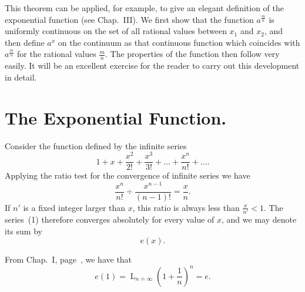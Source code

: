 \documentclass[a4paper,12pt]{book}[2004/02/16]
\providecommand{\hyperlink}[2]{#2}
\providecommand{\hypertarget}[2]{#2}
\theoremstyle{ilemma}
\theoremstyle{itheorem}
\theoremstyle{iother}
\theoremstyle{icorollary}
\theoremstyle{numcorollary}
\theoremstyle{idefinition}
\renewcommand{\dfrac}[2]{\frac{#1}{#2}}%
\begin{document}
This theorem can be applied, for example, to give an elegant
definition of the exponential function (see Chap.~\hyperlink{chapIII}{III}). We first show
that the function $a^\frac mn$ is uniformly continuous on the set of
all rational values between $x_1$ and $x_2$, and then define
$a^x$ on the continuum as that continuous function which coincides
with $a^\frac mn$ for the rational values $\dfrac mn$. The properties
of the function then follow very easily. It will be an excellent
exercise for the reader to carry out this development in detail.


\section{The Exponential Function.}\hypertarget{chVsec4}{}%
\label{s4p97}
Consider the function defined by the infinite series
\[
1+x+\frac{x^2}{2!}+\frac{x^3}{3!}+\ldots+\frac{x^n}{n!}+\ldots.
\tag{1}
\]
Applying the ratio test for the convergence of infinite series we have
\[
  \frac{x^n}{n!}\div\frac{x^{n-1}}{(n-1)!}=\frac xn.
\]
If $n'$ is a fixed integer larger than $x$, this ratio is always less
than $\dfrac x{n'}<1$. The series~(1) therefore converges absolutely
for every value of $x$, and we may denote its sum by
\[
  e(x).
\]

From Chap.~\hyperlink{chapI}{I}, page~\pageref{t7p17}, we have that
\[
  e(1)= \mathop{L}_{n\doteq\infty} \left(1+\frac1n\right)^n =e.
\]
\end{document}
